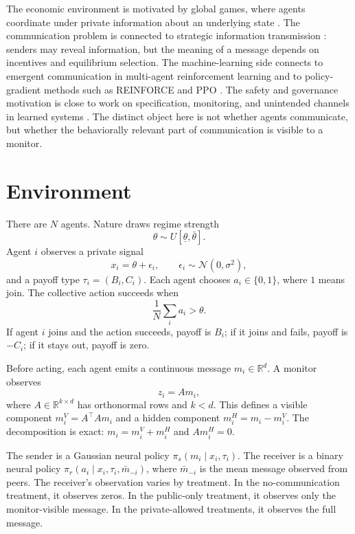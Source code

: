 \documentclass[11pt]{article}
\begin{document}
The economic environment is motivated by global games, where agents coordinate under private information about an underlying state \citep{morris1998unique}. The communication problem is connected to strategic information transmission \citep{crawford1982strategic}: senders may reveal information, but the meaning of a message depends on incentives and equilibrium selection. The machine-learning side connects to emergent communication in multi-agent reinforcement learning \citep{foerster2016learning, lazaridou2017multi, lowe2017multi} and to policy-gradient methods such as REINFORCE and PPO \citep{williams1992simple, schulman2017proximal}. The safety and governance motivation is close to work on specification, monitoring, and unintended channels in learned systems \citep{amodei2016concrete, leike2018scalable}. The distinct object here is not whether agents communicate, but whether the behaviorally relevant part of communication is visible to a monitor.

\section{Environment}

There are $N$ agents. Nature draws regime strength
\[
    \theta \sim U[\underline{\theta}, \bar{\theta}].
\]
Agent $i$ observes a private signal
\[
    x_i = \theta + \epsilon_i, \qquad \epsilon_i \sim \mathcal{N}(0,\sigma^2),
\]
and a payoff type $\tau_i=(B_i,C_i)$. Each agent chooses $a_i \in \{0,1\}$, where $1$ means join. The collective action succeeds when
\[
    \frac{1}{N}\sum_i a_i > \theta.
\]
If agent $i$ joins and the action succeeds, payoff is $B_i$; if it joins and fails, payoff is $-C_i$; if it stays out, payoff is zero.

Before acting, each agent emits a continuous message $m_i \in \mathbb{R}^d$. A monitor observes
\[
    z_i = A m_i,
\]
where $A \in \mathbb{R}^{k \times d}$ has orthonormal rows and $k<d$. This defines a visible component $m_i^V=A^\top A m_i$ and a hidden component $m_i^H=m_i-m_i^V$. The decomposition is exact: $m_i=m_i^V+m_i^H$ and $A m_i^H=0$.

The sender is a Gaussian neural policy $\pi_s(m_i\mid x_i,\tau_i)$. The receiver is a binary neural policy $\pi_r(a_i\mid x_i,\tau_i,\bar{m}_{-i})$, where $\bar{m}_{-i}$ is the mean message observed from peers. The receiver's observation varies by treatment. In the no-communication treatment, it observes zeros. In the public-only treatment, it observes only the monitor-visible message. In the private-allowed treatments, it observes the full message.
\end{document}
